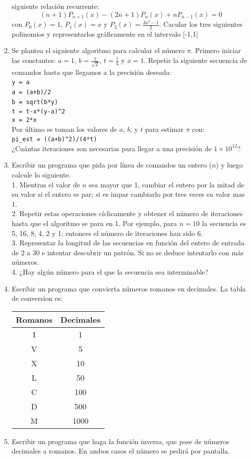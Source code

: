 \begin{enumerate}
  siguiente relación recurrente:
$$  (n+1)P_{n+1}(x)-(2n+1)P_{n}(x)+nP_{n-1}(x)=0$$ con $P_{0}(x)=1$,
  $P_{1}(x)=x$ y $P_{2}(x)=\frac{3x^{2}-1}{2}$.  Cacular los tres
  siguientes polinomios y representarlos gráficamente en el intervalo
  {[}-1,1{]}
\item Se plantea el siguiente algoritmo para calcular el número $\pi$.
  Primero iniciar las constantes: $a=1$, $b=\frac{1}{\sqrt{2}}$,
  $t=\frac{1}{4}$ y $x=1$. Repetir la siguiente secuencia de comandos
  hasta que llegamos
  a la precisión deseada:\\
  \texttt{y = a}~\\
  \texttt{a = (a+b)/2}~\\
  \texttt{b = sqrt(b{*}y)}~\\
  \texttt{t = t-x{*}(y-a)\textasciicircum{}2}~\\
  \texttt{x = 2{*}x}\\
  Por último se toman los valores de $a$, $b$, y $t$ para estimar
  $\pi$ con:\\
  \texttt{pi\_est = ((a+b)\textasciicircum{}2)/(4{*}t)}~\\
  ¿Cuántas iteraciones son necesarias para llegar a una precisión de
  $1\times10^{12}$?
\item Escribir un programa que pida por línea de comandos un entero
  ($n$)
  y luego calcule lo siguiente.\\
  1. Mientras el valor de $n$ sea mayor que 1, cambiar el entero por
  la mitad de su valor si el entero es par; si es impar cambiarlo por
  tres veces su valor mas 1.\\
  2. Repetir estas operaciones cíclicamente y obtener el número de
  iteraciones hasta que el algoritmo se para en 1. Por ejemplo, para
  $n=10$ la secuencia es 5, 16, 8, 4, 2 y 1; entonces el número de
  iteraciones
  han sido 6.\\
  3. Representar la longitud de las secuencias en función del entero
  de entrada de 2 a 30 e intentar descubrir un patrón. Si no se deduce
  intentarlo con más números.\\
  4. ¿Hay algún número para el que la secuencia sea interminable?
\item Escribir un programa que convierta números romanos en decimales.
  La
  tabla de conversion es: \\
  \begin{minipage}[c]{1\linewidth}%
\centering{}\begin{tabular}{|c|c|}
\hline 
Romanos&
Decimales\tabularnewline
\hline
\hline 
I&
1\tabularnewline
\hline 
V&
5\tabularnewline
\hline 
X&
10\tabularnewline
\hline 
L&
50\tabularnewline
\hline 
C&
100\tabularnewline
\hline 
D&
500\tabularnewline
\hline 
M&
1000\tabularnewline
\hline
\end{tabular}\end{minipage}%

\item Escribir un programa que haga la función inversa, que pase de números
decimales a romanos. En ambos casos el número se pedirá por pantalla.
\end{enumerate}

